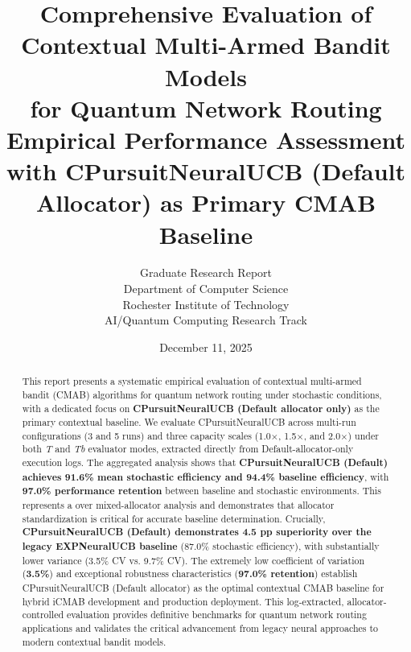 \documentclass[12pt,a4paper]{article}
\title{\textbf{Comprehensive Evaluation of Contextual Multi-Armed Bandit Models\\for Quantum Network Routing}\\
\large{Empirical Performance Assessment with CPursuitNeuralUCB (Default Allocator) as Primary CMAB Baseline}}
\author{Graduate Research Report\\
Department of Computer Science\\
Rochester Institute of Technology\\
AI/Quantum Computing Research Track}
\date{December 11, 2025}
\newcommand{\primarytext}[1]{\textcolor{primaryblue}{\textbf{#1}}}
\newcommand{\success}[1]{\textcolor{accentgreen}{\textbf{#1}}}
\begin{document}
\maketitle

\begin{abstract}
This report presents a systematic empirical evaluation of contextual multi-armed bandit (CMAB) algorithms for quantum network routing under stochastic conditions, with a dedicated focus on \primarytext{CPursuitNeuralUCB (Default allocator only)} as the primary contextual baseline. We evaluate CPursuitNeuralUCB across multi-run configurations (3 and 5 runs) and three capacity scales (1.0$\times$, 1.5$\times$, and 2.0$\times$) under both \emph{T} and \emph{Tb} evaluator modes, extracted directly from Default-allocator-only execution logs. The aggregated analysis shows that \success{CPursuitNeuralUCB (Default) achieves 91.6\% mean stochastic efficiency and 94.4\% baseline efficiency}, with \success{97.0\% performance retention} between baseline and stochastic environments. This represents a  over mixed-allocator analysis and demonstrates that allocator standardization is critical for accurate baseline determination. Crucially, \success{CPursuitNeuralUCB (Default) demonstrates 4.5 pp superiority over the legacy EXPNeuralUCB baseline} (87.0\% stochastic efficiency), with substantially lower variance (3.5\% CV vs. 9.7\% CV). The extremely low coefficient of variation (\success{3.5\%}) and exceptional robustness characteristics (\success{97.0\% retention}) establish CPursuitNeuralUCB (Default allocator) as the optimal contextual CMAB baseline for hybrid iCMAB development and production deployment. This log-extracted, allocator-controlled evaluation provides definitive benchmarks for quantum network routing applications and validates the critical advancement from legacy neural approaches to modern contextual bandit models.
\end{abstract}

\newpage
\vspace{0.5cm}
\tableofcontents

\newpage
\end{document}
